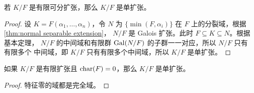 \begin{corollary}
  若 $K/F$ 是有限可分扩张，那么 $K/F$ 是单扩张。
\end{corollary}
\begin{proof}
  设 $K=F(\alpha_1,\dots,\alpha_n)$，令 $N$ 为 $\{\min(F,\alpha_i)\}$
  在 $F$ 上的分裂域，根据 \autoref{thm:normal separable extension}，
  $N/F$ 是 Galois 扩张。此时 $F\subseteq K\subseteq N$。根据基本定理，
  $N/F$ 的中间域和有限群 $\operatorname{Gal}(N/F)$ 的子群一一对应，所以 $N/F$ 只有有限多个
  中间域，即 $K/F$ 只有有限多个中间域，所以 $K/F$ 是单扩张。
\end{proof}

\begin{corollary}
  如果 $K/F$ 是有限扩张且 $\operatorname{char}(F)=0$，那么 $K/F$ 是单扩张。
\end{corollary}
\begin{proof}
  特征零的域都是完全域。
\end{proof}







